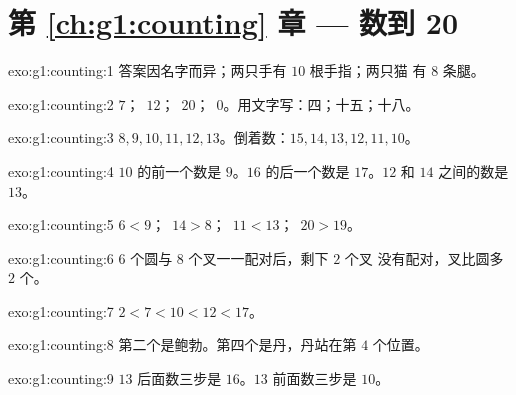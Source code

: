 \section*{第 \ref{ch:g1:counting} 章 --- 数到 20}

\begin{solution}{exo:g1:counting:1}
答案因名字而异；两只手有 $10$ 根手指；两只猫
有 $8$ 条腿。
\end{solution}

\begin{solution}{exo:g1:counting:2}
$7$；\ $12$；\ $20$；\ $0$。用文字写：四；十五；十八。
\end{solution}

\begin{solution}{exo:g1:counting:3}
$8, 9, 10, 11, 12, 13$。倒着数：$15, 14, 13, 12, 11, 10$。
\end{solution}

\begin{solution}{exo:g1:counting:4}
$10$ 的前一个数是 $9$。$16$ 的后一个数是 $17$。$12$ 和
$14$ 之间的数是 $13$。
\end{solution}

\begin{solution}{exo:g1:counting:5}
$6 < 9$；\ $14 > 8$；\ $11 < 13$；\ $20 > 19$。
\end{solution}

\begin{solution}{exo:g1:counting:6}
$6$ 个圆与 $8$ 个叉一一配对后，剩下 $2$ 个叉
没有配对，叉比圆多 $2$ 个。
\end{solution}

\begin{solution}{exo:g1:counting:7}
$2 < 7 < 10 < 12 < 17$。
\end{solution}

\begin{solution}{exo:g1:counting:8}
第二个是鲍勃。第四个是丹，丹站在第 $4$ 个位置。
\end{solution}

\begin{solution}{exo:g1:counting:9}
$13$ 后面数三步是 $16$。$13$ 前面数三步是 $10$。
\end{solution}
